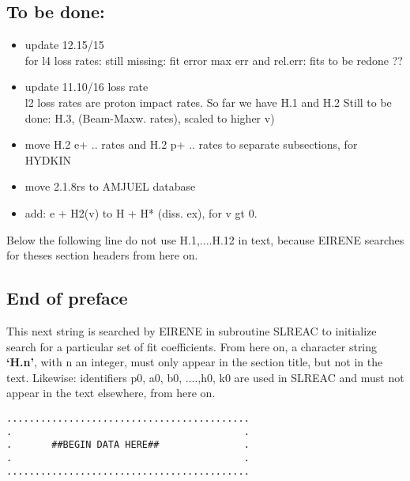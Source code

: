 \documentclass[12pt,dvipdfmx]{article}
\begin{document}
\subsection{To be done:}
\begin{itemize}
\item update 12.15/15 \\
for l4 loss rates: still missing: fit error max err and rel.err:
fits to be redone  ??\\
\item update 11.10/16 loss rate \\
l2 loss rates are proton impact rates. So far we have H.1 and H.2
Still to be done:  H.3, (Beam-Maxw. rates), scaled to
higher v)

\item  move H.2 e+ .. rates and H.2 p+ .. rates to separate subsections, for HYDKIN\\
\item move 2.1.8rs to AMJUEL database\\
\item add:  e + H2(v) to  H + H*  (diss. ex), for v gt 0.
\end{itemize}

Below the following line do not use H.1,....H.12 in text, because EIRENE searches for theses section headers
from here on.


\subsection{End of preface}
This next string is searched by EIRENE in subroutine SLREAC
to initialize search for a particular set of fit coefficients.
From here on, a character string \textbf{`H.n'}, with n an integer, must only appear in the
section title,
but not in the text. Likewise: identifiers p0, a0, b0, ....,h0, k0 are used
in SLREAC and must not
appear in the text elsewhere, from here on.

\bigskip
\begin{small}\begin{verbatim}
...........................................
.                                         .
.       ##BEGIN DATA HERE##               .
.                                         .
...........................................
\end{verbatim}\end{small}
\newpage
\renewcommand{\theHsection}{arabicsection.\thesection}
\renewcommand\thesection{\arabic{section}}
\setcounter{section}{0}  %
\end{document}
